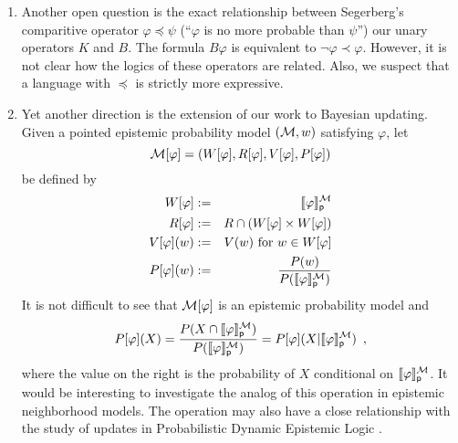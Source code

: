 \documentclass[12pt]{article}
\theoremstyle{definition}
\newcommand{\M}{{\cal M}}      %
\newcommand{\semp}[1]{\llbracket{#1}\rrbracket_{\mathsf{p}}} %
\begin{document}
\begin{enumerate}
\item Another open question is the exact relationship between
  Segerberg's comparitive operator $\varphi\preceq\psi$ (``$\varphi$
  is no more probable than $\psi$'')
  \cite{Gardenfors75,Segerberg1971:qpiams} our unary operators $K$ and
  $B$.  The formula $B\varphi$ is equivalent to
  $\lnot\varphi\prec\varphi$.  However, it is not clear how the logics
  of these operators are related. Also, we suspect that a language
  with $\preceq$ is strictly more expressive.

\item Yet another direction is the extension of our work to Bayesian
  updating.  Given a pointed epistemic probability model $(\M,w)$
  satisfying $\varphi$, let
  \[
  \M[\varphi]=(W[\varphi],R[\varphi],V[\varphi],P[\varphi])
  \]
  be defined by
\begin{eqnarray*}
  W[\varphi] &:=& \semp{\varphi}^\M \\
  R[\varphi] &:=& R \cap (W[\varphi]\times W[\varphi]) \\
  V[\varphi](w) &:=& V(w) \text{ for } w\in W[\varphi] \\
  P[\varphi](w) &:=&
    \frac{ P(w) }{ P(\semp{\varphi}^\M) }
\end{eqnarray*}
It is not difficult to see that $\M[\varphi]$ is an epistemic probability model and
\[
P[\varphi](X) =
\frac{ P(X\cap\semp{\varphi}^\M) }{ P(\semp{\varphi}^\M) } = 
P[\varphi](X|\semp{\varphi}^\M)\enspace,
\]
where the value on the right is the probability of $X$ conditional on
$\semp{\varphi}^\M$.  It would be interesting to investigate the analog
of this operation in epistemic neighborhood models.  The operation may
also have a close relationship with the study of updates in
Probabilistic Dynamic Epistemic Logic
\cite{BenGerKoo09:SL,BalSme08:Synt}.


\end{enumerate}
\end{document}
